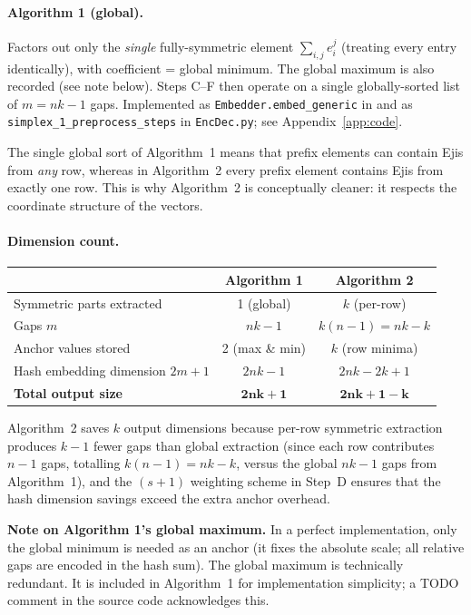 \documentclass[11pt,a4paper]{article}
\newcommand{\encdecpy}{\texttt{EncDec.py}}
\newcommand{\eji}[2]{e^{#1}_{#2}}       %
\begin{document}
\paragraph{Algorithm 1 (global).}
Factors out only the \emph{single} fully-symmetric element $\sum_{i,j}
\eji{j}{i}$ (treating every entry identically), with coefficient = global
minimum.  The global maximum is also recorded (see note below).  Steps C--F
then operate on a single globally-sorted list of $m = nk-1$ gaps.
Implemented as \texttt{Embedder.embed\_generic} in \algonepy{} and as
\texttt{simplex\_1\_preprocess\_steps} in \encdecpy{}; see
Appendix~\ref{app:code}.

The single global sort of Algorithm~1 means that prefix elements can contain
Ejis from \emph{any} row, whereas in Algorithm~2 every prefix element contains
Ejis from exactly one row.  This is why Algorithm~2 is conceptually cleaner:
it respects the coordinate structure of the vectors.

\paragraph{Dimension count.}
\begin{center}
\renewcommand{\arraystretch}{1.3}
\begin{tabular}{lcc}
  \toprule
  & \textbf{\textcolor{alg1col}{Algorithm 1}} & \textbf{\textcolor{alg2col}{Algorithm 2}} \\
  \midrule
  Symmetric parts extracted & 1 (global) & $k$ (per-row) \\
  Gaps $m$ & $nk-1$ & $k(n-1)=nk-k$ \\
  Anchor values stored & 2 (max \& min) & $k$ (row minima) \\
  Hash embedding dimension $2m+1$ & $2nk-1$ & $2nk-2k+1$ \\
  \textbf{Total output size} & $\mathbf{2nk+1}$ & $\mathbf{2nk+1-k}$ \\
  \bottomrule
\end{tabular}
\end{center}

Algorithm~2 saves $k$ output dimensions because per-row symmetric extraction
produces $k-1$ fewer gaps than global extraction (since each row contributes
$n-1$ gaps, totalling $k(n-1) = nk-k$, versus the global $nk-1$ gaps from
Algorithm~1), and the $(s+1)$ weighting scheme in Step~D ensures that the
hash dimension savings exceed the extra anchor overhead.

\begin{tcolorbox}[notebox]
\textbf{Note on Algorithm 1's global maximum.}  In a perfect implementation,
only the global minimum is needed as an anchor (it fixes the absolute scale;
all relative gaps are encoded in the hash sum).  The global maximum is
technically redundant.  It is included in Algorithm~1 for implementation
simplicity; a TODO comment in the source code acknowledges this.
\end{tcolorbox}
\end{document}
